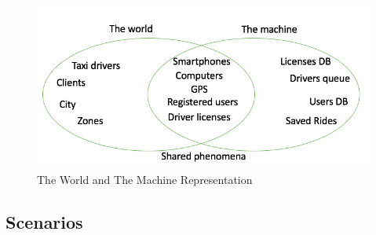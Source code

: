 \documentclass[a4paper]{article}
\begin{document}
\begin{figure}[H]
\includegraphics[width=.8\textwidth]{WorldAndMachine}
\centering
\caption{The World and The Machine Representation}
\end{figure}

\subsection{Scenarios}
\end{document}
